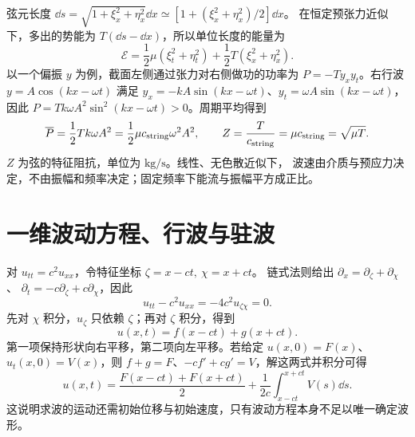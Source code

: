 \begin{center}
\label{ch12:fig:string-element}
\end{center}

弦元长度
$\dd s=\sqrt{1+\xi_x^2+\eta_x^2}\dd x
\simeq[1+(\xi_x^2+\eta_x^2)/2]\dd x$。
在恒定预张力近似下，多出的势能为 $T(\dd s-\dd x)$，所以单位长度的能量为
\begin{equation}
 \mathcal E=\frac12\mu(\xi_t^2+\eta_t^2)+\frac12T(\xi_x^2+\eta_x^2).
 \label{ch12:eq:string-energy}
\end{equation}
以一个偏振 $y$ 为例，截面左侧通过张力对右侧做功的功率为
$P=-Ty_xy_t$。右行波 $y=A\cos(kx-\omega t)$ 满足
$y_x=-kA\sin(kx-\omega t)$、$y_t=\omega A\sin(kx-\omega t)$，
因此 $P=Tk\omega A^2\sin^2(kx-\omega t)>0$。周期平均得到
\begin{equation}
 \overline P=\frac12Tk\omega A^2
 =\frac12\mu c_{\rm string}\omega^2A^2,\qquad
 Z=\frac T{c_{\rm string}}=\mu c_{\rm string}=\sqrt{\mu T}.
 \label{ch12:eq:string-power}
\end{equation}
$Z$ 为弦的特征阻抗，单位为 $\mathrm{kg/s}$。线性、无色散近似下，
波速由介质与预应力决定，不由振幅和频率决定；固定频率下能流与振幅平方成正比。

\section{一维波动方程、行波与驻波}

对 $u_{tt}=c^2u_{xx}$，令特征坐标 $\zeta=x-ct,\ \chi=x+ct$。
链式法则给出
$\partial_x=\partial_\zeta+\partial_\chi$、
$\partial_t=-c\partial_\zeta+c\partial_\chi$，因此
\[
 u_{tt}-c^2u_{xx}=-4c^2u_{\zeta\chi}=0.
\]
先对 $\chi$ 积分，$u_\zeta$ 只依赖 $\zeta$；再对 $\zeta$ 积分，得到
\begin{equation}
 u(x,t)=f(x-ct)+g(x+ct).
 \label{ch12:eq:dalembert}
\end{equation}
第一项保持形状向右平移，第二项向左平移。若给定
$u(x,0)=F(x)$、$u_t(x,0)=V(x)$，则
$f+g=F$、$-cf'+cg'=V$，解这两式并积分可得
\[
 u(x,t)=\frac{F(x-ct)+F(x+ct)}2+
 \frac1{2c}\int_{x-ct}^{x+ct}V(s)\dd s.
\]
这说明求波的运动还需初始位移与初始速度，只有波动方程本身不足以唯一确定波形。

